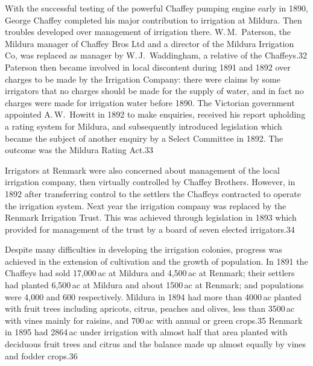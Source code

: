 With the successful testing of the powerful Chaffey pumping engine
early in 1890, George Chaffey completed his major contribution to
irrigation at Mildura. Then troubles developed over management of
irrigation there. W.\,M.~Paterson, the Mildura manager of Chaffey Bros
Ltd and a director of the Mildura Irrigation Co, was replaced as
manager by W.\,J.~Waddingham, a relative of the Chaffeys.32 Paterson
then became involved in local discontent during 1891 and 1892 over
charges to be made by the Irrigation Company: there were claims by
some irrigators that no charges should be made for the supply of
water, and in fact no charges were made for irrigation water before
1890.  The Victorian government appointed A.\,W.~Howitt in 1892 to
make enquiries, received his report upholding a rating system for
Mildura, and subsequently introduced legislation which became the
subject of another enquiry by a Select Committee in 1892.  The outcome
was the Mildura Rating Act.33

Irrigators at Renmark were also concerned about management of the
local irrigation company, then virtually controlled by Chaffey
Brothers.  However, in 1892 after transferring control to the settlers
the Chaffeys contracted to operate the irrigation system.  Next year
the irrigation company was replaced by the Renmark Irrigation Trust.
This was achieved through legislation in 1893 which provided for
management of the trust by a board of seven elected irrigators.34

Despite many difficulties in developing the irrigation colonies,
progress was achieved in the extension of cultivation and the growth
of population.  In 1891 the Chaffeys had sold 17,000\,ac at Mildura
and 4,500\,ac at Renmark; their settlers had planted 6,500\,ac at
Mildura and about 1500\,ac at Renmark; and populations were 4,000 and
600 respectively.  Mildura in 1894 had more than 4000\,ac planted with
fruit trees including apricots, citrus, peaches and olives, less than
3500\,ac with vines mainly for raisins, and 700\,ac with annual or
green crops.35 Renmark in 1895 had 2864\,ac under irrigation with
almost half that area planted with deciduous fruit trees and citrus
and the balance made up almost equally by vines and fodder crops.36

